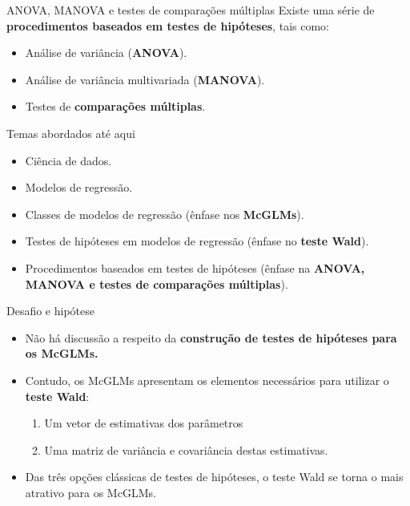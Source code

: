 \documentclass[
  ignorenonframetext,
  serif,
  professionalfont,
  usenames,
  dvipsnames,
  aspectratio = 169]{beamer}
\begin{document}
\begin{frame}{ANOVA, MANOVA e testes de comparações múltiplas}
\protect\hypertarget{anova-manova-e-testes-de-comparauxe7uxf5es-muxfaltiplas}{}
Existe uma série de
\textbf{procedimentos baseados em testes de hipóteses}, tais como:

\begin{itemize}

  \itemsep 2ex
  
  \item Análise de variância (\textbf{ANOVA}).
  \item Análise de variância multivariada (\textbf{MANOVA}).
  \item Testes de \textbf{comparações múltiplas}.

\end{itemize}
\end{frame}

\begin{frame}{Temas abordados até aqui}
\protect\hypertarget{temas-abordados-atuxe9-aqui}{}
\begin{itemize}
  \itemsep 2ex
    
  \item Ciência de dados.

  \item Modelos de regressão.

  \item Classes de modelos de regressão (ênfase nos \textbf{McGLMs}).

  \item Testes de hipóteses em modelos de regressão (ênfase no \textbf{teste Wald}).

  \item Procedimentos baseados em testes de hipóteses (ênfase na \textbf{ANOVA, MANOVA e testes de comparações múltiplas}).

\end{itemize}
\end{frame}

\begin{frame}{Desafio e hipótese}
\protect\hypertarget{desafio-e-hipuxf3tese}{}
\begin{itemize}
  \itemsep 2ex
    
  \item Não há discussão a respeito da \textbf{construção de testes de hipóteses para os McGLMs.}    

  \item Contudo, os McGLMs apresentam os elementos necessários para utilizar o \textbf{teste Wald}:
    \begin{enumerate}
      \item Um vetor de estimativas dos parâmetros
      \item Uma matriz de variância e covariância destas estimativas.
    \end{enumerate}
    
  \item Das três opções clássicas de testes de hipóteses, o teste Wald se torna o mais atrativo para os McGLMs. 

\end{itemize}
\end{frame}
\end{document}
